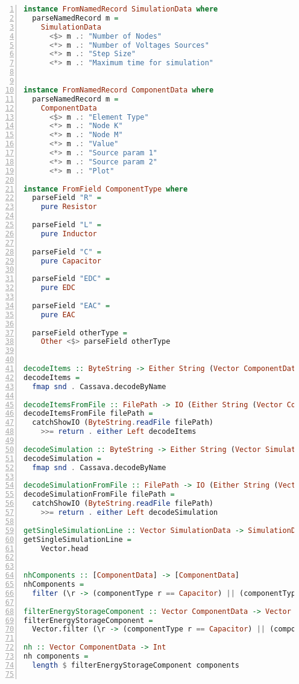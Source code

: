 \begin{lstlisting}[language=Haskell, numbers=left, caption={Main.hs file code}, captionpos=b, label={lst:maincompletecode}]
instance FromNamedRecord SimulationData where
  parseNamedRecord m =
    SimulationData
      <$> m .: "Number of Nodes"
      <*> m .: "Number of Voltages Sources"
      <*> m .: "Step Size"
      <*> m .: "Maximum time for simulation"


instance FromNamedRecord ComponentData where
  parseNamedRecord m =
    ComponentData
      <$> m .: "Element Type"
      <*> m .: "Node K"
      <*> m .: "Node M"
      <*> m .: "Value"
      <*> m .: "Source param 1"
      <*> m .: "Source param 2"
      <*> m .: "Plot"

instance FromField ComponentType where
  parseField "R" =
    pure Resistor

  parseField "L" =
    pure Inductor

  parseField "C" =
    pure Capacitor

  parseField "EDC" =
    pure EDC

  parseField "EAC" =
    pure EAC

  parseField otherType =
    Other <$> parseField otherType


decodeItems :: ByteString -> Either String (Vector ComponentData)
decodeItems =
  fmap snd . Cassava.decodeByName

decodeItemsFromFile :: FilePath -> IO (Either String (Vector ComponentData))
decodeItemsFromFile filePath =
  catchShowIO (ByteString.readFile filePath)
    >>= return . either Left decodeItems

decodeSimulation :: ByteString -> Either String (Vector SimulationData)
decodeSimulation =
  fmap snd . Cassava.decodeByName

decodeSimulationFromFile :: FilePath -> IO (Either String (Vector SimulationData))
decodeSimulationFromFile filePath =
  catchShowIO (ByteString.readFile filePath)
    >>= return . either Left decodeSimulation

getSingleSimulationLine :: Vector SimulationData -> SimulationData
getSingleSimulationLine = 
    Vector.head 


nhComponents :: [ComponentData] -> [ComponentData]
nhComponents =
  filter (\r -> (componentType r == Capacitor) || (componentType r == Inductor))

filterEnergyStorageComponent :: Vector ComponentData -> Vector ComponentData
filterEnergyStorageComponent =
  Vector.filter (\r -> (componentType r == Capacitor) || (componentType r == Inductor))

nh :: Vector ComponentData -> Int
nh components =
  length $ filterEnergyStorageComponent components
    

\end{lstlisting}
